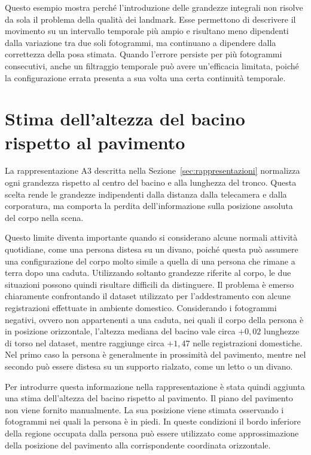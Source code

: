 Questo esempio mostra perché l'introduzione delle grandezze integrali non risolve da sola il problema della qualità dei landmark. Esse permettono di descrivere il movimento su un intervallo temporale più ampio e risultano meno dipendenti dalla variazione tra due soli fotogrammi, ma continuano a dipendere dalla correttezza della posa stimata. Quando l'errore persiste per più fotogrammi consecutivi, anche un filtraggio temporale può avere un'efficacia limitata, poiché la configurazione errata presenta a sua volta una certa continuità temporale.

\section{Stima dell'altezza del bacino rispetto al pavimento}
\label{sec:pavimento}

La rappresentazione A3 descritta nella Sezione~\ref{sec:rappresentazioni} normalizza ogni grandezza rispetto al centro del bacino e alla lunghezza del tronco. Questa scelta rende le grandezze indipendenti dalla distanza dalla telecamera e dalla corporatura, ma comporta la perdita dell'informazione sulla posizione assoluta del corpo nella scena.

Questo limite diventa importante quando si considerano alcune normali attività quotidiane, come una persona distesa su un divano, poiché questa può assumere una configurazione del corpo molto simile a quella di una persona che rimane a terra dopo una caduta. Utilizzando soltanto grandezze riferite al corpo, le due situazioni possono quindi risultare difficili da distinguere.
Il problema è emerso chiaramente confrontando il dataset utilizzato per l'addestramento con alcune registrazioni effettuate in ambiente domestico. Considerando i fotogrammi negativi, ovvero non appartenenti a una caduta, nei quali il corpo della persona è in posizione orizzontale, l'altezza mediana del bacino vale circa $+0{,}02$ lunghezze di torso nel dataset, mentre raggiunge circa $+1{,}47$ nelle registrazioni domestiche. Nel primo caso la persona è generalmente in prossimità del pavimento, mentre nel secondo può essere distesa su un supporto rialzato, come un letto o un divano.

Per introdurre questa informazione nella rappresentazione è stata quindi aggiunta una stima dell'altezza del bacino rispetto al pavimento. Il piano del pavimento non viene fornito manualmente. La sua posizione viene stimata osservando i fotogrammi nei quali la persona è in piedi. In queste condizioni il bordo inferiore della regione occupata dalla persona può essere utilizzato come approssimazione della posizione del pavimento alla corrispondente coordinata orizzontale.


